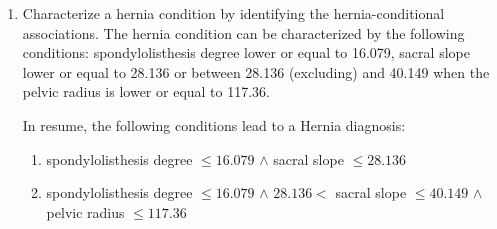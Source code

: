 \documentclass[12pt]{article}
\begin{document}
\begin{enumerate}
\begin{enumerate}
        \item Characterize a hernia condition by identifying the hernia-conditional associations.
        The hernia condition can be characterized by the following conditions: spondylolisthesis degree lower or equal to 16.079, sacral slope lower or equal to 28.136 or between 28.136 (excluding) and 40.149 when the pelvic radius is lower or equal to 117.36.

        In resume, the following conditions lead to a Hernia diagnosis:

        \begin{enumerate}
            \item spondylolisthesis degree $\leq 16.079$ $\land$ sacral slope $\leq 28.136$
            \item spondylolisthesis degree $\leq 16.079$ $\land$ $28.136 <$ sacral slope $\leq 40.149$ $\land$ pelvic radius $\leq 117.36$
        \end{enumerate}
            
    \end{enumerate}
\end{enumerate}
\end{document}
